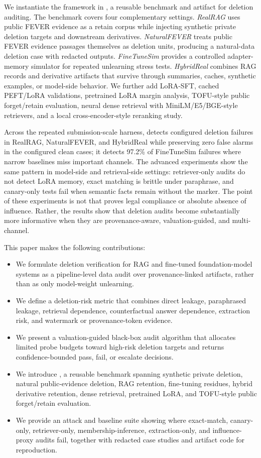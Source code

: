 We instantiate the framework in \bench{}, a reusable benchmark and artifact for deletion auditing. The benchmark covers four complementary settings. \emph{RealRAG} uses public FEVER evidence as a retain corpus while injecting synthetic private deletion targets and downstream derivatives. \emph{NaturalFEVER} treats public FEVER evidence passages themselves as deletion units, producing a natural-data deletion case with redacted outputs. \emph{FineTuneSim} provides a controlled adapter-memory simulator for repeated unlearning stress tests. \emph{HybridReal} combines RAG records and derivative artifacts that survive through summaries, caches, synthetic examples, or model-side behavior. We further add LoRA-SFT, cached PEFT/LoRA validations, pretrained LoRA margin analysis, TOFU-style public forget/retain evaluation, neural dense retrieval with MiniLM/E5/BGE-style retrievers, and a local cross-encoder-style reranking study.

Across the repeated submission-scale harness, \method{} detects configured deletion failures in RealRAG, NaturalFEVER, and HybridReal while preserving zero false alarms in the configured clean cases; it detects 97.2\% of FineTuneSim failures where narrow baselines miss important channels. The advanced experiments show the same pattern in model-side and retrieval-side settings: retriever-only audits do not detect LoRA memory, exact matching is brittle under paraphrase, and canary-only tests fail when semantic facts remain without the marker. The point of these experiments is not that \method{} proves legal compliance or absolute absence of influence. Rather, the results show that deletion audits become substantially more informative when they are provenance-aware, valuation-guided, and multi-channel.

This paper makes the following contributions:
\begin{itemize}
\item We formulate deletion verification for RAG and fine-tuned foundation-model systems as a pipeline-level data audit over provenance-linked artifacts, rather than as only model-weight unlearning.
\item We define a deletion-risk metric that combines direct leakage, paraphrased leakage, retrieval dependence, counterfactual answer dependence, extraction risk, and watermark or provenance-token evidence.
\item We present a valuation-guided black-box audit algorithm that allocates limited probe budgets toward high-risk deletion targets and returns confidence-bounded pass, fail, or escalate decisions.
\item We introduce \bench{}, a reusable benchmark spanning synthetic private deletion, natural public-evidence deletion, RAG retention, fine-tuning residues, hybrid derivative retention, dense retrieval, pretrained LoRA, and TOFU-style public forget/retain evaluation.
\item We provide an attack and baseline suite showing where exact-match, canary-only, retriever-only, membership-inference, extraction-only, and influence-proxy audits fail, together with redacted case studies and artifact code for reproduction.
\end{itemize}

